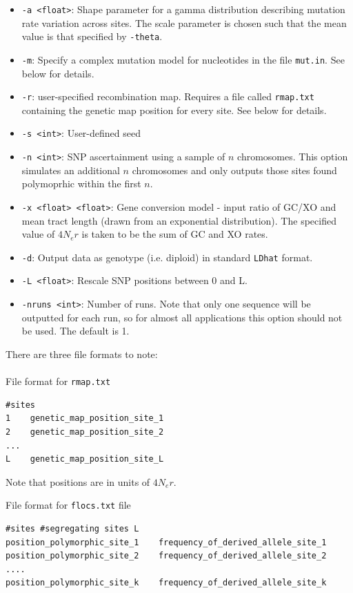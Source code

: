 \documentclass[a4paper,10pt,fullpage]{article}
\begin{document}
\begin{itemize}
\item \verb+-a <float>+: Shape parameter for a gamma distribution describing mutation rate variation across sites.  The scale parameter is chosen such that the mean value is that specified by \verb+-theta+.
\item \verb+-m+: Specify a complex mutation model for nucleotides in the file \verb+mut.in+.  See below for details.
\item \verb+-r+: user-specified recombination map.  Requires a file called \verb+rmap.txt+ containing the genetic map position for every site. See below for details.
\item \verb+-s <int>+: User-defined seed
\item \verb+-n <int>+: SNP ascertainment using a sample of $n$ chromosomes. This option simulates an additional $n$ chromosomes and only outputs those sites found polymoprhic within the first $n$.
\item \verb+-x <float> <float>+: Gene conversion model - input ratio of GC/XO and mean tract length (drawn from an exponential distribution).  The specified value of $4N_er$ is taken to be the sum of GC and XO rates.
\item \verb+-d+: Output data as genotype (i.e. diploid) in standard \verb+LDhat+ format.
\item \verb+-L <float>+: Rescale SNP positions between 0 and L.
\item \verb+-nruns <int>+: Number of runs.  Note that only one sequence will be outputted for each run, so for almost all applications this option should not be used.  The default is 1.
\end{itemize}

\noindent There are three file formats to note:\\\\
\noindent File format for \verb+rmap.txt+\\
\begin{verbatim}
#sites
1    genetic_map_position_site_1
2    genetic_map_position_site_2
...
L    genetic_map_position_site_L
\end{verbatim}
Note that positions are in units of $4N_er$.  


\vspace{1.0cm} \noindent File format for \verb+flocs.txt+ file\\
\begin{verbatim}
#sites #segregating sites L
position_polymorphic_site_1    frequency_of_derived_allele_site_1
position_polymorphic_site_2    frequency_of_derived_allele_site_2
....
position_polymorphic_site_k    frequency_of_derived_allele_site_k
\end{verbatim}
\end{document}
